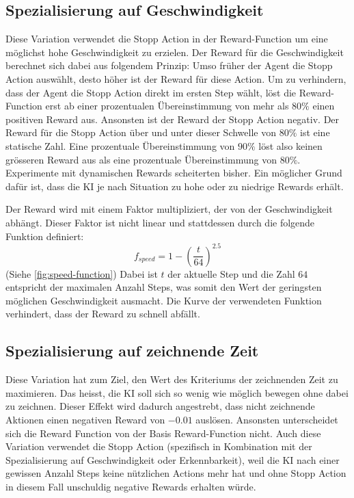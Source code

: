 \subsection{Spezialisierung auf Geschwindigkeit}\label{sub:m_var_speed} Diese
Variation verwendet die Stopp Action in der Reward-Function um eine möglichst
hohe Geschwindigkeit zu erzielen. Der Reward für die Geschwindigkeit berechnet
sich dabei aus folgendem Prinzip: Umso früher der Agent die Stopp Action
auswählt, desto höher ist der Reward für diese Action. Um zu verhindern, dass
der Agent die Stopp Action direkt im ersten Step wählt, löst die Reward-Function
erst ab einer prozentualen Übereinstimmung von mehr als $80\%$ einen positiven
Reward aus. Ansonsten ist der Reward der Stopp Action negativ. Der Reward für
die Stopp Action über und unter dieser Schwelle von $80\%$ ist eine statische
Zahl. Eine prozentuale Übereinstimmung von $90\%$ löst also keinen grösseren
Reward aus als eine prozentuale Übereinstimmung von $80\%$. Experimente mit
dynamischen Rewards scheiterten bisher. Ein möglicher Grund dafür ist, dass die
KI je nach Situation zu hohe oder zu niedrige Rewards erhält.

Der Reward wird mit einem Faktor multipliziert, der von der Geschwindigkeit
abhängt. Dieser Faktor ist nicht linear und stattdessen durch die folgende Funktion definiert:
$$ f_{speed} = 1 - (\frac{t}{64})^{2.5}$$ (Siehe \autoref{fig:speed-function}) Dabei ist
$t$ der aktuelle Step und die Zahl $64$ entspricht der maximalen Anzahl Steps,
was somit den Wert der geringsten möglichen Geschwindigkeit ausmacht. Die Kurve
der verwendeten Funktion verhindert, dass der Reward zu schnell abfällt.

\label{fig:speed-function}


\subsection{Spezialisierung auf zeichnende Zeit}\label{sub:m_var_penlift}
Diese Variation hat zum Ziel, den Wert des Kriteriums der zeichnenden Zeit zu
maximieren. Das heisst, die KI soll sich so wenig wie möglich bewegen ohne dabei
zu zeichnen. Dieser Effekt wird dadurch angestrebt, dass nicht zeichnende
Aktionen einen negativen Reward von $-0.01$ auslösen. Ansonsten unterscheidet
sich die Reward Function von der Basis Reward-Function nicht. Auch diese
Variation verwendet die Stopp Action (spezifisch in Kombination mit der
Spezialisierung auf Geschwindigkeit oder Erkennbarkeit), weil die KI nach einer
gewissen Anzahl Steps keine nützlichen Actions mehr hat und ohne Stopp Action in
diesem Fall unschuldig negative Rewards erhalten würde.

